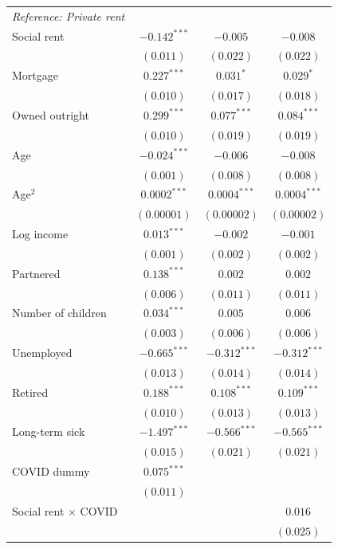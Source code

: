 \documentclass[12pt,a4paper]{article}
\begin{document}
\begin{ThreePartTable}
\begin{longtable}{lccc}
\textit{Reference: Private rent} & & & \\[0.3em]
Social rent
  & $-0.142^{***}$ & $-0.005$    & $-0.008$    \\
  & $(0.011)$      & $(0.022)$   & $(0.022)$   \\[0.3em]
Mortgage
  & $0.227^{***}$  & $0.031^{*}$ & $0.029^{*}$ \\
  & $(0.010)$      & $(0.017)$   & $(0.018)$   \\[0.3em]
Owned outright
  & $0.299^{***}$  & $0.077^{***}$ & $0.084^{***}$ \\
  & $(0.010)$      & $(0.019)$     & $(0.019)$     \\[0.5em]
Age
  & $-0.024^{***}$ & $-0.006$  & $-0.008$  \\
  & $(0.001)$      & $(0.008)$ & $(0.008)$ \\[0.3em]
Age$^{2}$
  & $0.0002^{***}$ & $0.0004^{***}$ & $0.0004^{***}$ \\
  & $(0.00001)$    & $(0.00002)$    & $(0.00002)$    \\[0.3em]
Log income
  & $0.013^{***}$ & $-0.002$ & $-0.001$ \\
  & $(0.001)$     & $(0.002)$ & $(0.002)$ \\[0.3em]
Partnered
  & $0.138^{***}$ & $0.002$   & $0.002$   \\
  & $(0.006)$     & $(0.011)$ & $(0.011)$ \\[0.3em]
Number of children
  & $0.034^{***}$ & $0.005$   & $0.006$   \\
  & $(0.003)$     & $(0.006)$ & $(0.006)$ \\[0.3em]
Unemployed
  & $-0.665^{***}$ & $-0.312^{***}$ & $-0.312^{***}$ \\
  & $(0.013)$      & $(0.014)$      & $(0.014)$      \\[0.3em]
Retired
  & $0.188^{***}$ & $0.108^{***}$ & $0.109^{***}$ \\
  & $(0.010)$     & $(0.013)$     & $(0.013)$     \\[0.3em]
Long-term sick
  & $-1.497^{***}$ & $-0.566^{***}$ & $-0.565^{***}$ \\
  & $(0.015)$      & $(0.021)$      & $(0.021)$      \\[0.3em]
COVID dummy
  & $0.075^{***}$ &         &       \\
  & $(0.011)$     &         &       \\[0.5em]
Social rent $\times$ COVID   & & & $0.016$  \\
                             & & & $(0.025)$ \\[0.3em]

\end{longtable}
\end{ThreePartTable}
\end{document}
